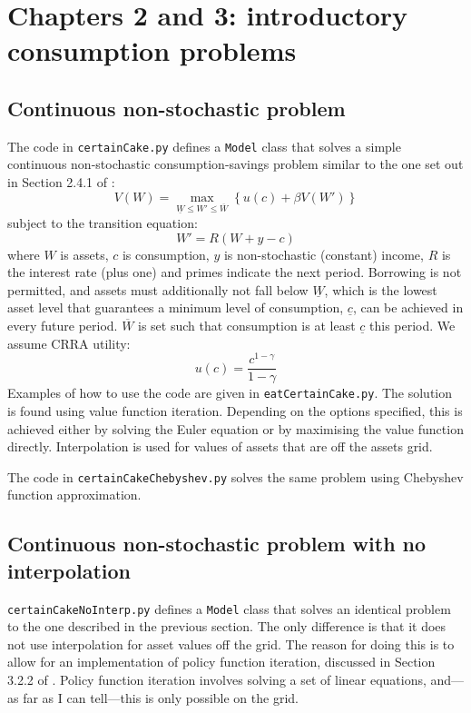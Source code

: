 \section{Chapters 2 and 3: introductory consumption problems}

\subsection{Continuous non-stochastic problem}

The code in \texttt{certainCake.py} defines a \texttt{Model} class that solves a simple continuous non-stochastic consumption-savings problem similar to the one set out in Section 2.4.1 of \citet{adda2003dynamic}:
\begin{equation}
	V(W) = \max_{\underline{W} \leq W' \leq \overline{W}} \left\{ u(c) + \beta V(W') \right\}
\end{equation}
subject to the transition equation:
\begin{equation}
	W' = R (W + y - c)
\end{equation}
where \(W\) is assets, \(c\) is consumption, \(y\) is non-stochastic (constant) income, \(R\) is the interest rate (plus one) and primes indicate the next period. Borrowing is not permitted, and assets must additionally not fall below \(\underline{W}\), which is the lowest asset level that guarantees a minimum level of consumption, \(\underline{c}\), can be achieved in every future period. \(\overline{W}\) is set such that consumption is at least \(\underline{c}\) this period. We assume CRRA utility:
\begin{equation}
	u(c) = \frac{c^{1 - \gamma}}{1 - \gamma}
\end{equation}
Examples of how to use the code are given in \texttt{eatCertainCake.py}. The solution is found using value function iteration. Depending on the options specified, this is achieved either by solving the Euler equation or by maximising the value function directly. Interpolation is used for values of assets that are off the assets grid.

The code in \texttt{certainCakeChebyshev.py} solves the same problem using Chebyshev function approximation.

\subsection{Continuous non-stochastic problem with no interpolation}

\texttt{certainCakeNoInterp.py} defines a \texttt{Model} class that solves an identical problem to the one described in the previous section. The only difference is that it does not use interpolation for asset values off the grid. The reason for doing this is to allow for an implementation of policy function iteration, discussed in Section 3.2.2 of \citet{adda2003dynamic}. Policy function iteration involves solving a set of linear equations, and---as far as I can tell---this is only possible on the grid.

